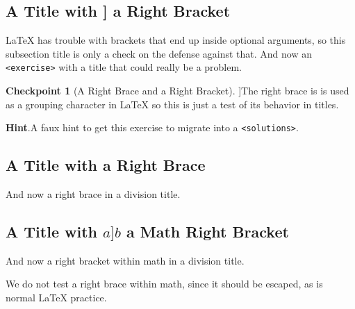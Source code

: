 \documentclass{amsart}
\theoremstyle{plain}%
\theoremstyle{definition}%
\newtheorem{inlineexercise}[theorem]{Checkpoint}
\theoremstyle{remark}%
\newcommand{\blocktitlefont}{\relax}
\newcommand{\mono}[1]{\texttt{#1}}
\numberwithin{equation}{section}
\begin{document}
\subsection{A Title with ] a Right Bracket}\label{subsection-with-an-exercise}%
\LaTeX{} has trouble with brackets that end up inside optional arguments, so this subsection title is only a check on the defense against that.  And now an \mono{<exercise>} with a title that could really be a problem.%
\begin{inlineexercise}[A Right Brace \textbraceright{} and a Right Bracket]]\label{exercise-difficult-title}%
%
The right brace is is used as a grouping character in \LaTeX{} so this is just a test of its behavior in titles.%
\par\smallskip%
\noindent\textbf{\blocktitlefont Hint}.\hypertarget{exercise-difficult-title-3}{}\quad{}A faux hint to get this exercise to migrate into a \mono{<solutions>}.%
\end{inlineexercise}%
%
%
\typeout{************************************************}
\typeout{************************************************}
%
\subsection{A Title with \textbraceright{} a Right Brace}\label{section-advanced-numbering-10}%
And now a right brace in a division title.%
%
%
\typeout{************************************************}
\typeout{Subsection 31.9 A Title with \(a]b\) a Math Right Bracket}
\typeout{************************************************}
%
\subsection{A Title with \(a]b\) a Math Right Bracket}\label{section-advanced-numbering-11}%
And now a right bracket within math in a division title.%
\par
We do not test a right brace within math, since it should be escaped, as is normal \LaTeX{} practice.%
%
%
\typeout{************************************************}
\typeout{************************************************}
%
\end{document}
